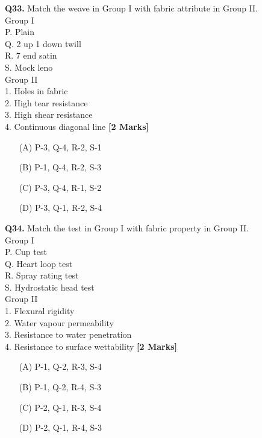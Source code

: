\documentclass[11pt]{article}
\newcommand{\questionb}[2]{
    \noindent\textbf{Q#2.} #1 \hfill \textbf{[2 Marks]}
}
\begin{document}
\questionb{Match the weave in Group I with fabric attribute in Group II. \\
Group I \\
P. Plain \\
Q. 2 up 1 down twill \\
R. 7 end satin \\
S. Mock leno \\
Group II \\
1. Holes in fabric \\
2. High tear resistance \\
3. High shear resistance \\
4. Continuous diagonal line}{33}
\begin{enumerate}
    \item[(A)] P-3, Q-4, R-2, S-1
    \item[(B)] P-1, Q-4, R-2, S-3
    \item[(C)] P-3, Q-4, R-1, S-2
    \item[(D)] P-3, Q-1, R-2, S-4
\end{enumerate}
\vspace{0.5cm}

\questionb{Match the test in Group I with fabric property in Group II. \\
Group I \\
P. Cup test \\
Q. Heart loop test \\
R. Spray rating test \\
S. Hydrostatic head test \\
Group II \\
1. Flexural rigidity \\
2. Water vapour permeability \\
3. Resistance to water penetration \\
4. Resistance to surface wettability}{34}
\begin{enumerate}
    \item[(A)] P-1, Q-2, R-3, S-4
    \item[(B)] P-1, Q-2, R-4, S-3
    \item[(C)] P-2, Q-1, R-3, S-4
    \item[(D)] P-2, Q-1, R-4, S-3
\end{enumerate}
\vspace{0.5cm}
\end{document}
